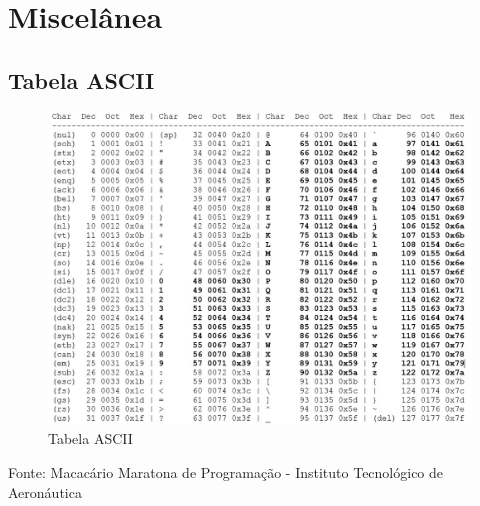 \newpage
\section{Miscelânea}
\subsection{Tabela ASCII}

\begin{figure}[H]
    \caption{Tabela ASCII} 
    \vspace{0.5cm}
    \vspace{\belowcaptionskip}
    \centering
    \includegraphics[scale = 0.5]{image/ascii.jpg}
    \par\medskip
    \label{fig:ascii}
\end{figure}

\begin{center}
    Fonte: Macacário Maratona de Programação - Instituto Tecnológico de Aeronáutica
\end{center}